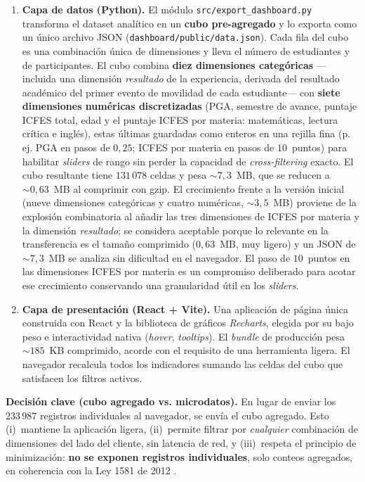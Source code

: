 \documentclass[12pt,a4paper]{article}
\begin{document}
\begin{enumerate}[leftmargin=*]
    \item \textbf{Capa de datos (Python).} El módulo
    \texttt{src/export\_dashboard.py} transforma el dataset analítico en un
    \textbf{cubo pre-agregado} y lo exporta como un único archivo JSON
    (\texttt{dashboard/public/data.json}). Cada fila del cubo es una combinación
    única de dimensiones y lleva el número de estudiantes y de participantes. El
    cubo combina \textbf{diez dimensiones categóricas} ---incluida una dimensión
    \emph{resultado} de la experiencia, derivada del resultado académico del primer
    evento de movilidad de cada estudiante--- con \textbf{siete dimensiones
    numéricas discretizadas} (PGA, semestre de avance, puntaje ICFES total, edad y
    el puntaje ICFES por materia: matemáticas, lectura crítica e inglés), estas
    últimas guardadas como enteros en una rejilla fina (p.\,ej. PGA en pasos de
    $0{,}25$; ICFES por materia en pasos de $10$~puntos) para habilitar
    \emph{sliders} de rango sin perder la capacidad de \emph{cross-filtering}
    exacto. El cubo resultante tiene $131\,078$ celdas y pesa $\sim 7{,}3$~MB, que
    se reducen a $\sim 0{,}63$~MB al comprimir con gzip. El crecimiento frente a la
    versión inicial (nueve dimensiones categóricas y cuatro numéricas, $\sim
    3{,}5$~MB) proviene de la explosión combinatoria al añadir las tres dimensiones
    de ICFES por materia y la dimensión \emph{resultado}; se considera aceptable
    porque lo relevante en la transferencia es el tamaño comprimido ($0{,}63$~MB,
    muy ligero) y un JSON de $\sim 7{,}3$~MB se analiza sin dificultad en el
    navegador. El paso de $10$~puntos en las dimensiones ICFES por materia es un
    compromiso deliberado para acotar ese crecimiento conservando una granularidad
    útil en los \emph{sliders}.
    \item \textbf{Capa de presentación (React + Vite).} Una aplicación de página
    única construida con React y la biblioteca de gráficos \emph{Recharts},
    elegida por su bajo peso e interactividad nativa (\emph{hover}, \emph{tooltips}).
    El \emph{bundle} de producción pesa $\sim 185$~KB comprimido, acorde con el
    requisito de una herramienta ligera. El navegador recalcula todos los
    indicadores sumando las celdas del cubo que satisfacen los filtros activos.
\end{enumerate}

\textbf{Decisión clave (cubo agregado vs. microdatos).} En lugar de enviar los
$233\,987$ registros individuales al navegador, se envía el cubo agregado. Esto
(i)~mantiene la aplicación ligera, (ii)~permite filtrar por \emph{cualquier}
combinación de dimensiones del lado del cliente, sin latencia de red, y
(iii)~respeta el principio de minimización: \textbf{no se exponen registros
individuales}, solo conteos agregados, en coherencia con la Ley 1581 de 2012
\cite{ley1581,decreto1377}.
\end{document}

